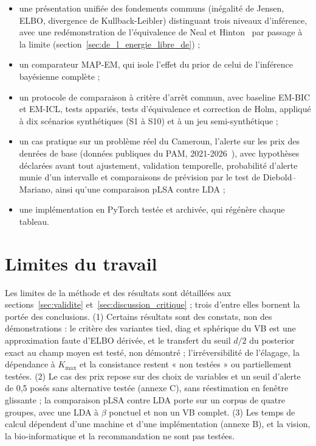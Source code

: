 \begin{itemize}
\item une présentation unifiée des fondements communs (inégalité de Jensen, ELBO, divergence de Kullback-Leibler) distinguant trois niveaux d'inférence, avec une redémonstration de l'équivalence de Neal et Hinton~\cite{neal1998} par passage à la limite (section~\ref{sec:de_l_energie_libre_de}) ;
\item un comparateur MAP-EM, qui isole l'effet du prior de celui de l'inférence bayésienne complète ;
\item un protocole de comparaison à critère d'arrêt commun, avec baseline EM-BIC et EM-ICL, tests appariés, tests d'équivalence et correction de Holm, appliqué à dix scénarios synthétiques (S1 à S10) et à un jeu semi-synthétique ;
\item un cas pratique sur un problème réel du Cameroun, l'alerte sur les prix des denrées de base (données publiques du PAM, 2021-2026~\cite{pam2026donnees}), avec hypothèses déclarées avant tout ajustement, validation temporelle, probabilité d'alerte munie d'un intervalle et comparaisons de prévision par le test de Diebold--Mariano, ainsi qu'une comparaison pLSA contre LDA ;
\item une implémentation en PyTorch testée et archivée, qui régénère chaque tableau.
\end{itemize}

\section*{Limites du travail}
Les limites de la méthode et des résultats sont détaillées aux sections~\ref{sec:validite} et~\ref{sec:discussion_critique} ; trois d'entre elles bornent la portée des conclusions. (1) Certains résultats sont des constats, non des démonstrations : le critère des variantes tied, diag et sphérique du VB est une approximation faute d'ELBO dérivée, et le transfert du seuil $d/2$ du posterior exact au champ moyen est testé, non démontré ; l'irréversibilité de l'élagage, la dépendance à $K_{\max}$ et la consistance restent « non testées » ou partiellement testées. (2) Le cas des prix repose sur des choix de variables et un seuil d'alerte de 0,5 posés sans alternative testée (annexe C), sans réestimation en fenêtre glissante ; la comparaison pLSA contre LDA porte sur un corpus de quatre groupes, avec une LDA à $\beta$ ponctuel et non un VB complet. (3) Les temps de calcul dépendent d'une machine et d'une implémentation (annexe B), et la vision, la bio-informatique et la recommandation ne sont pas testées.

